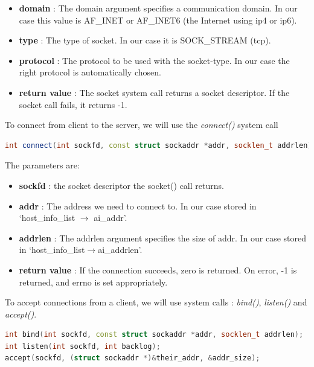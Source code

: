 \documentclass{article}
\begin{document}
				\begin{itemize}
				\item \textbf{domain} : The domain argument specifies a communication domain. In our case this value is AF\_INET or AF\_INET6 (the Internet using ip4 or ip6). 
				\item \textbf{type} : The type of socket. In our case it is SOCK\_STREAM (tcp). 
				\item \textbf{protocol} : The protocol to be used with the socket-type. In our case the right protocol is automatically chosen. 
				\item \textbf{return value} : The socket system call returns a socket descriptor. If the socket call fails, it returns -1. 
				\end{itemize}

				To connect from client to the server, we will use the \textit{connect()} system call

				\begin{lstlisting}[language=C++, caption ={connect() function}]
int connect(int sockfd, const struct sockaddr *addr, socklen_t addrlen); 
				\end{lstlisting} 	

				The parameters are:

				\begin{itemize}
				\item \textbf{sockfd} : the socket descriptor the socket() call returns. 
				\item \textbf{addr} : The address we need to connect to. In our case stored in `host\_info\_list $\rightarrow$ ai\_addr'. 
				\item \textbf{addrlen} : The addrlen argument specifies the size of addr. In our case stored in `host\_info\_list$\rightarrow$ai\_addrlen'. 
				\item \textbf{return value} : If the connection succeeds, zero is returned. On error, -1 is returned, and errno is set appropriately.
				\end{itemize}

				To accept connections from a client, we will use system calls : \textit{bind()}, \textit{listen()} and \textit{accept()}.

				\begin{lstlisting}[language=C++, caption ={bind(), listen() and accept() function}]
int bind(int sockfd, const struct sockaddr *addr, socklen_t addrlen); 
int listen(int sockfd, int backlog);
accept(sockfd, (struct sockaddr *)&their_addr, &addr_size); 
				\end{lstlisting}				 
\end{document}
